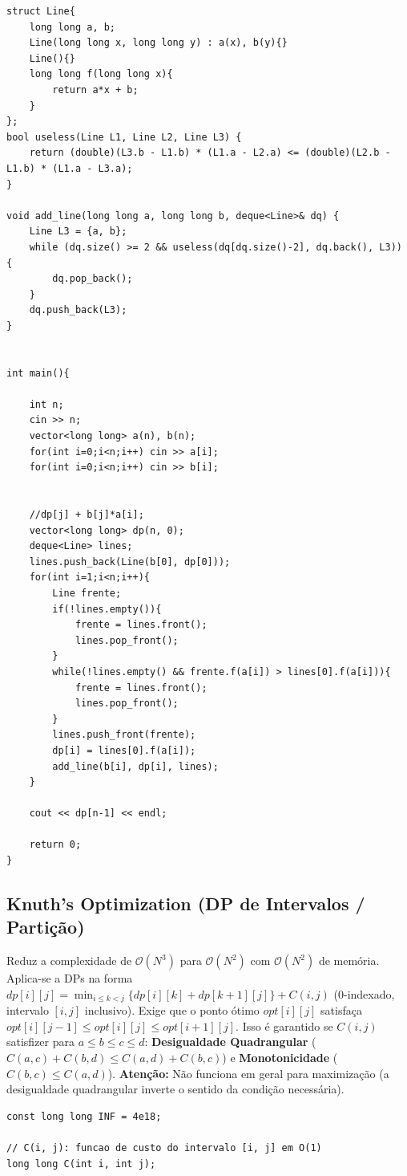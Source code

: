 \documentclass[11pt]{article}
\begin{document}
\begin{multicols}{2}
\begin{lstlisting}
struct Line{
    long long a, b;
    Line(long long x, long long y) : a(x), b(y){}
    Line(){}
    long long f(long long x){
        return a*x + b;
    }
};
bool useless(Line L1, Line L2, Line L3) {
    return (double)(L3.b - L1.b) * (L1.a - L2.a) <= (double)(L2.b - L1.b) * (L1.a - L3.a);
}

void add_line(long long a, long long b, deque<Line>& dq) {
    Line L3 = {a, b};
    while (dq.size() >= 2 && useless(dq[dq.size()-2], dq.back(), L3)) {
        dq.pop_back();
    }
    dq.push_back(L3);
}


int main(){

    int n;
    cin >> n;
    vector<long long> a(n), b(n);
    for(int i=0;i<n;i++) cin >> a[i];
    for(int i=0;i<n;i++) cin >> b[i];


    //dp[j] + b[j]*a[i];
    vector<long long> dp(n, 0);
    deque<Line> lines;
    lines.push_back(Line(b[0], dp[0]));
    for(int i=1;i<n;i++){
        Line frente;
        if(!lines.empty()){
            frente = lines.front();
            lines.pop_front();
        }
        while(!lines.empty() && frente.f(a[i]) > lines[0].f(a[i])){
            frente = lines.front();
            lines.pop_front();
        }
        lines.push_front(frente);
        dp[i] = lines[0].f(a[i]);
        add_line(b[i], dp[i], lines);
    }

    cout << dp[n-1] << endl;

    return 0;
}
\end{lstlisting}

\subsection{Knuth's Optimization (DP de Intervalos / Partição)}
Reduz a complexidade de $\mathcal{O}(N^3)$ para $\mathcal{O}(N^2)$ com $\mathcal{O}(N^2)$ de memória. Aplica-se a DPs na forma $dp[i][j] = \min_{i \le k < j} \{dp[i][k] + dp[k+1][j]\} + C(i, j)$ (0-indexado, intervalo $[i, j]$ inclusivo). Exige que o ponto ótimo $opt[i][j]$ satisfaça $opt[i][j-1] \le opt[i][j] \le opt[i+1][j]$. Isso é garantido se $C(i, j)$ satisfizer para $a \le b \le c \le d$: \textbf{Desigualdade Quadrangular} ($C(a, c) + C(b, d) \le C(a, d) + C(b, c)$) e \textbf{Monotonicidade} ($C(b, c) \le C(a, d)$). \textbf{Atenção:} Não funciona em geral para maximização (a desigualdade quadrangular inverte o sentido da condição necessária).
\begin{lstlisting}
const long long INF = 4e18;

// C(i, j): funcao de custo do intervalo [i, j] em O(1)
long long C(int i, int j);


\end{lstlisting}
\end{multicols}
\end{document}
